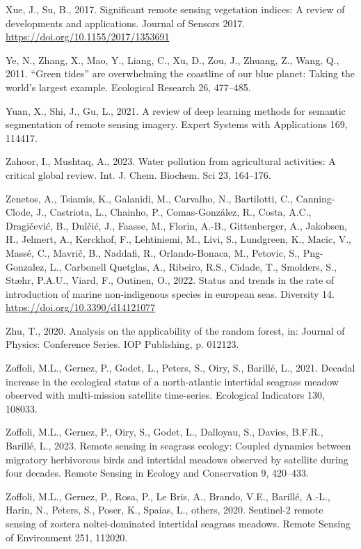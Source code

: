 \documentclass[
  letterpaper,
  11pt,
  english,
  singlespacing,
  headsepline]{MastersDoctoralThesis}
\newlength{\cslhangindent}
\newenvironment{CSLReferences}[2] %
 {\begin{list}{}{%
  \setlength{\itemindent}{0pt}
  \setlength{\leftmargin}{0pt}
  \setlength{\parsep}{0pt}
  \ifodd #1
   \setlength{\leftmargin}{\cslhangindent}
   \setlength{\itemindent}{-1\cslhangindent}
  \fi
  \setlength{\itemsep}{#2\baselineskip}}}
 {\end{list}}
\begin{document}
\begin{CSLReferences}{1}{0}
Xue, J., Su, B., 2017. {Significant remote sensing vegetation indices: A
review of developments and applications}. Journal of Sensors 2017.
\url{https://doi.org/10.1155/2017/1353691}

Ye, N., Zhang, X., Mao, Y., Liang, C., Xu, D., Zou, J., Zhuang, Z.,
Wang, Q., 2011. {``Green tides''} are overwhelming the coastline of our
blue planet: Taking the world's largest example. Ecological Research 26,
477--485.

Yuan, X., Shi, J., Gu, L., 2021. A review of deep learning methods for
semantic segmentation of remote sensing imagery. Expert Systems with
Applications 169, 114417.

Zahoor, I., Mushtaq, A., 2023. Water pollution from agricultural
activities: A critical global review. Int. J. Chem. Biochem. Sci 23,
164--176.

Zenetos, A., Tsiamis, K., Galanidi, M., Carvalho, N., Bartilotti, C.,
Canning-Clode, J., Castriota, L., Chainho, P., Comas-González, R.,
Costa, A.C., Dragičević, B., Dulčić, J., Faasse, M., Florin, A.-B.,
Gittenberger, A., Jakobsen, H., Jelmert, A., Kerckhof, F., Lehtiniemi,
M., Livi, S., Lundgreen, K., Macic, V., Massé, C., Mavrič, B., Naddafi,
R., Orlando-Bonaca, M., Petovic, S., Png-Gonzalez, L., Carbonell
Quetglas, A., Ribeiro, R.S., Cidade, T., Smolders, S., Stæhr, P.A.U.,
Viard, F., Outinen, O., 2022. Status and trends in the rate of
introduction of marine non-indigenous species in european seas.
Diversity 14. \url{https://doi.org/10.3390/d14121077}

Zhu, T., 2020. Analysis on the applicability of the random forest, in:
Journal of Physics: Conference Series. IOP Publishing, p. 012123.

Zoffoli, M.L., Gernez, P., Godet, L., Peters, S., Oiry, S., Barillé, L.,
2021. Decadal increase in the ecological status of a north-atlantic
intertidal seagrass meadow observed with multi-mission satellite
time-series. Ecological Indicators 130, 108033.

Zoffoli, M.L., Gernez, P., Oiry, S., Godet, L., Dalloyau, S., Davies,
B.F.R., Barillé, L., 2023. Remote sensing in seagrass ecology: Coupled
dynamics between migratory herbivorous birds and intertidal meadows
observed by satellite during four decades. Remote Sensing in Ecology and
Conservation 9, 420--433.

Zoffoli, M.L., Gernez, P., Rosa, P., Le Bris, A., Brando, V.E., Barillé,
A.-L., Harin, N., Peters, S., Poser, K., Spaias, L., others, 2020.
Sentinel-2 remote sensing of zostera noltei-dominated intertidal
seagrass meadows. Remote Sensing of Environment 251, 112020.

\end{CSLReferences}
\end{document}
